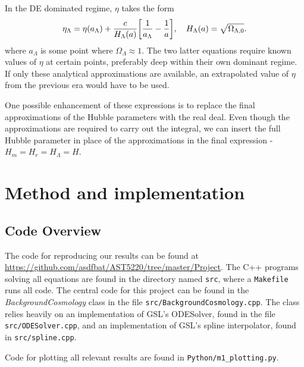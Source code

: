 \documentclass[10pt, a4paper]{article}
\begin{document}
In the DE dominated regime, $\eta$ takes the form
\begin{align}
    \eta_\Lambda = \eta(a_\Lambda) + \frac{c}{H_\Lambda(a)}\qty[\frac{1}{a_\Lambda} - \frac{1}{a}], \quad H_\Lambda(a) = \sqrt{\Omega_{\Lambda,0}}.
\end{align}
where $a_\Lambda$ is some point where $\Omega_\Lambda \approx 1$. The two latter equations require known values of $\eta$ at certain points, preferably deep within their own dominant regime. If only these analytical approximations are available, an extrapolated value of $\eta$ from the previous era would have to be used.

One possible enhancement of these expressions is to replace the final approximations of the Hubble parameters with the real deal. Even though the approximations are required to carry out the integral, we can insert the full Hubble parameter in place of the approximations in the final expression - $H_m = H_r = H_{\Lambda} = H$.


\section{Method and implementation}
\subsection{Code Overview}
The code for reproducing our results can be found at \url{https://github.com/asdfbat/AST5220/tree/master/Project}. The C++ programs solving all equations are found in the directory named \texttt{src}, where a \texttt{Makefile} runs all code. The central code for this project can be found in the \textit{BackgroundCosmology} class in the file \texttt{src/BackgroundCosmology.cpp}. The class relies heavily on an implementation of GSL's ODESolver, found in the file \texttt{src/ODESolver.cpp}, and an implementation of GSL's spline interpolator, found in \texttt{src/spline.cpp}.

Code for plotting all relevant results are found in \texttt{Python/m1\_plotting.py}.
\end{document}
